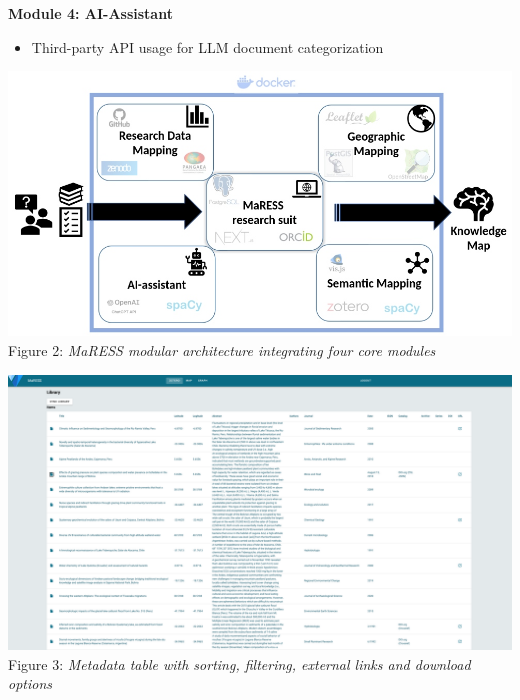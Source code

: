 \documentclass[a0,portrait]{a0poster}
\begin{document}
\begin{multicols}{3}
\begin{tcolorbox}[mainbox, title={\Large\textbf{Modular System Design}}]
		\vspace{0.5cm}
		\textbf{Module 4: AI-Assistant}
		\begin{itemize}[leftmargin=*]
			\item Third-party API usage for LLM document categorization
		\end{itemize}
		\vspace{1.3cm}
	\end{tcolorbox}

	\begin{center}
		\vspace{2.2cm}
		\includegraphics[width=0.9\linewidth]{project-overview}\\
		\vspace{0.2cm}
    {\small Figure 2: \textit{MaRESS modular architecture integrating four core modules}}

		\vspace{3.2cm}
		\includegraphics[width=0.9\linewidth]{items-table}\\
		\vspace{0.2cm}
		{\small Figure 3: \textit{Metadata table with sorting, filtering, external links and download options}}
	\end{center}


\end{multicols}
\end{document}
